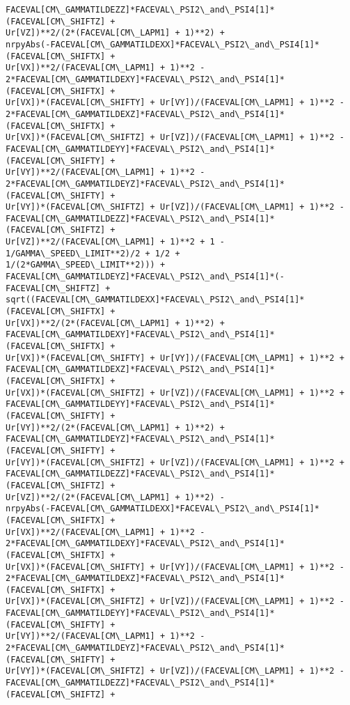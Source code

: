 \documentclass[landscape,letterpaper,10pt,english]{article}
\begin{document}
\begin{Verbatim}[commandchars=\\\{\}]
FACEVAL[CM\_GAMMATILDEZZ]*FACEVAL\_PSI2\_and\_PSI4[1]*(FACEVAL[CM\_SHIFTZ] +
Ur[VZ])**2/(2*(FACEVAL[CM\_LAPM1] + 1)**2) +
nrpyAbs(-FACEVAL[CM\_GAMMATILDEXX]*FACEVAL\_PSI2\_and\_PSI4[1]*(FACEVAL[CM\_SHIFTX] +
Ur[VX])**2/(FACEVAL[CM\_LAPM1] + 1)**2 -
2*FACEVAL[CM\_GAMMATILDEXY]*FACEVAL\_PSI2\_and\_PSI4[1]*(FACEVAL[CM\_SHIFTX] +
Ur[VX])*(FACEVAL[CM\_SHIFTY] + Ur[VY])/(FACEVAL[CM\_LAPM1] + 1)**2 -
2*FACEVAL[CM\_GAMMATILDEXZ]*FACEVAL\_PSI2\_and\_PSI4[1]*(FACEVAL[CM\_SHIFTX] +
Ur[VX])*(FACEVAL[CM\_SHIFTZ] + Ur[VZ])/(FACEVAL[CM\_LAPM1] + 1)**2 -
FACEVAL[CM\_GAMMATILDEYY]*FACEVAL\_PSI2\_and\_PSI4[1]*(FACEVAL[CM\_SHIFTY] +
Ur[VY])**2/(FACEVAL[CM\_LAPM1] + 1)**2 -
2*FACEVAL[CM\_GAMMATILDEYZ]*FACEVAL\_PSI2\_and\_PSI4[1]*(FACEVAL[CM\_SHIFTY] +
Ur[VY])*(FACEVAL[CM\_SHIFTZ] + Ur[VZ])/(FACEVAL[CM\_LAPM1] + 1)**2 -
FACEVAL[CM\_GAMMATILDEZZ]*FACEVAL\_PSI2\_and\_PSI4[1]*(FACEVAL[CM\_SHIFTZ] +
Ur[VZ])**2/(FACEVAL[CM\_LAPM1] + 1)**2 + 1 - 1/GAMMA\_SPEED\_LIMIT**2)/2 + 1/2 +
1/(2*GAMMA\_SPEED\_LIMIT**2))) +
FACEVAL[CM\_GAMMATILDEYZ]*FACEVAL\_PSI2\_and\_PSI4[1]*(-FACEVAL[CM\_SHIFTZ] +
sqrt((FACEVAL[CM\_GAMMATILDEXX]*FACEVAL\_PSI2\_and\_PSI4[1]*(FACEVAL[CM\_SHIFTX] +
Ur[VX])**2/(2*(FACEVAL[CM\_LAPM1] + 1)**2) +
FACEVAL[CM\_GAMMATILDEXY]*FACEVAL\_PSI2\_and\_PSI4[1]*(FACEVAL[CM\_SHIFTX] +
Ur[VX])*(FACEVAL[CM\_SHIFTY] + Ur[VY])/(FACEVAL[CM\_LAPM1] + 1)**2 +
FACEVAL[CM\_GAMMATILDEXZ]*FACEVAL\_PSI2\_and\_PSI4[1]*(FACEVAL[CM\_SHIFTX] +
Ur[VX])*(FACEVAL[CM\_SHIFTZ] + Ur[VZ])/(FACEVAL[CM\_LAPM1] + 1)**2 +
FACEVAL[CM\_GAMMATILDEYY]*FACEVAL\_PSI2\_and\_PSI4[1]*(FACEVAL[CM\_SHIFTY] +
Ur[VY])**2/(2*(FACEVAL[CM\_LAPM1] + 1)**2) +
FACEVAL[CM\_GAMMATILDEYZ]*FACEVAL\_PSI2\_and\_PSI4[1]*(FACEVAL[CM\_SHIFTY] +
Ur[VY])*(FACEVAL[CM\_SHIFTZ] + Ur[VZ])/(FACEVAL[CM\_LAPM1] + 1)**2 +
FACEVAL[CM\_GAMMATILDEZZ]*FACEVAL\_PSI2\_and\_PSI4[1]*(FACEVAL[CM\_SHIFTZ] +
Ur[VZ])**2/(2*(FACEVAL[CM\_LAPM1] + 1)**2) -
nrpyAbs(-FACEVAL[CM\_GAMMATILDEXX]*FACEVAL\_PSI2\_and\_PSI4[1]*(FACEVAL[CM\_SHIFTX] +
Ur[VX])**2/(FACEVAL[CM\_LAPM1] + 1)**2 -
2*FACEVAL[CM\_GAMMATILDEXY]*FACEVAL\_PSI2\_and\_PSI4[1]*(FACEVAL[CM\_SHIFTX] +
Ur[VX])*(FACEVAL[CM\_SHIFTY] + Ur[VY])/(FACEVAL[CM\_LAPM1] + 1)**2 -
2*FACEVAL[CM\_GAMMATILDEXZ]*FACEVAL\_PSI2\_and\_PSI4[1]*(FACEVAL[CM\_SHIFTX] +
Ur[VX])*(FACEVAL[CM\_SHIFTZ] + Ur[VZ])/(FACEVAL[CM\_LAPM1] + 1)**2 -
FACEVAL[CM\_GAMMATILDEYY]*FACEVAL\_PSI2\_and\_PSI4[1]*(FACEVAL[CM\_SHIFTY] +
Ur[VY])**2/(FACEVAL[CM\_LAPM1] + 1)**2 -
2*FACEVAL[CM\_GAMMATILDEYZ]*FACEVAL\_PSI2\_and\_PSI4[1]*(FACEVAL[CM\_SHIFTY] +
Ur[VY])*(FACEVAL[CM\_SHIFTZ] + Ur[VZ])/(FACEVAL[CM\_LAPM1] + 1)**2 -
FACEVAL[CM\_GAMMATILDEZZ]*FACEVAL\_PSI2\_and\_PSI4[1]*(FACEVAL[CM\_SHIFTZ] +

\end{Verbatim}
\end{document}
